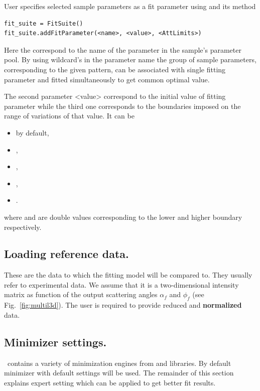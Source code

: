 User specifies selected sample parameters as a fit parameter using 
and its  method

\begin{lstlisting}[language=shell, style=commandline]
fit_suite = FitSuite()
fit_suite.addFitParameter(<name>, <value>, <AttLimits>)
\end{lstlisting}

Here the  correspond to the name of the parameter in the sample's parameter pool.
By using wildcard's in the parameter name the group of sample parameters, corresponding to the given
pattern, can be associated with single fitting parameter and 
fitted simultaneously to get common optimal value.

The second parameter \Code <value> correspond to the initial value of fitting parameter
while the third one  corresponds to
the boundaries imposed on the range of variations of that value. It can be
\begin{itemize}
\item {} by default, 
\item {}, 
\item {}, 
\item {}, 
\item {}.
\end{itemize}
where  and  are
double values corresponding to the lower and higher boundary respectively.



\subsection{Loading reference data.}
These are the data to which the fitting model will
be compared to. They usually refer to experimental data. We assume that it is a
two-dimensional intensity matrix as function of the output scattering
angles $\alpha_f$ and $\phi_f$ (see Fig.~\ref{fig:multil3d}). The user
is required to provide reduced and \textbf{normalized} data. 



\subsection{Minimizer settings.}

\BornAgain\ contains a variety of minimization engines from  and 
libraries. By default  minimizer with default settings will be used.
The remainder of this section explains expert setting which can be applied to get better 
fit results.

